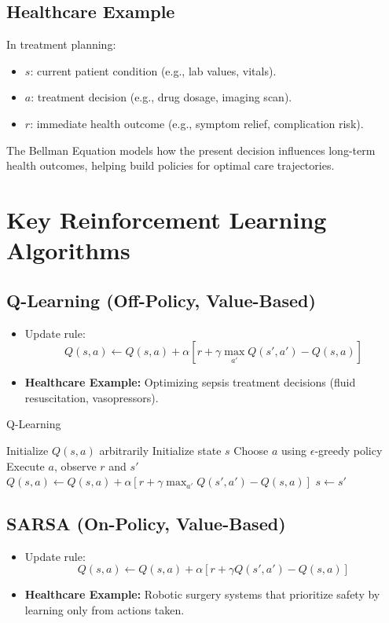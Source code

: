 \documentclass[12pt]{article}
\begin{document}
\subsection*{Healthcare Example}

In treatment planning:
\begin{itemize}
    \item $s$: current patient condition (e.g., lab values, vitals).
    \item $a$: treatment decision (e.g., drug dosage, imaging scan).
    \item $r$: immediate health outcome (e.g., symptom relief, complication risk).
\end{itemize}

The Bellman Equation models how the present decision influences long-term health outcomes, helping build policies for optimal care trajectories.

\section{Key Reinforcement Learning Algorithms}
\subsection{Q-Learning (Off-Policy, Value-Based)}
\begin{itemize}
    \item Update rule:
    \[
    Q(s,a) \leftarrow Q(s,a) + \alpha \left[r + \gamma \max_{a'} Q(s',a') - Q(s,a)\right]
    \]
    \item \textbf{Healthcare Example:} Optimizing sepsis treatment decisions (fluid resuscitation, vasopressors).
\end{itemize}

\begin{algorithm}[H]
\caption{Q-Learning}
\begin{algorithmic}[1]
\State Initialize $Q(s,a)$ arbitrarily
    \State Initialize state $s$
    \Repeat
        \State Choose $a$ using $\epsilon$-greedy policy
        \State Execute $a$, observe $r$ and $s'$
        \State $Q(s,a) \leftarrow Q(s,a) + \alpha[r + \gamma \max_{a'} Q(s',a') - Q(s,a)]$
        \State $s \leftarrow s'$
\EndFor
\end{algorithmic}
\end{algorithm}

\subsection{SARSA (On-Policy, Value-Based)}
\begin{itemize}
    \item Update rule:
    \[
    Q(s,a) \leftarrow Q(s,a) + \alpha \left[r + \gamma Q(s',a') - Q(s,a)\right]
    \]
    \item \textbf{Healthcare Example:} Robotic surgery systems that prioritize safety by learning only from actions taken.
\end{itemize}
\end{document}
